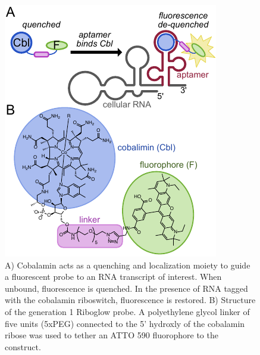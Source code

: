 \begin{figure}
\begin{centering}
\includegraphics[width=\textwidth]{figures/fig1v3.pdf}

\end{centering}
\footnotesize
\caption{\label{figure:riboglow}
A) Cobalamin acts as a quenching and localization moiety to guide a fluorescent probe to an RNA transcript of interest. When unbound, fluorescence is quenched. In the presence of RNA tagged with the cobalamin riboswitch, fluorescence is restored. B) Structure of the generation 1 Riboglow probe. A polyethylene glycol linker of five units (5xPEG) connected to the 5' hydroxly of the cobalamin ribose was used to tether an ATTO 590 fluorophore to the construct.
}
\end{figure}

